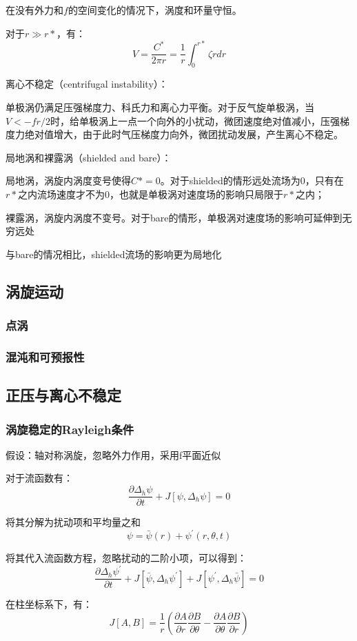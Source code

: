 \documentclass{article}
\begin{document}
在没有外力和$f$的空间变化的情况下，涡度和环量守恒。

对于$r \gg r*$，有：
$$V = \frac{C^*}{2\pi r}=\frac{1}{r}\int_0^{r*}\zeta rdr$$

离心不稳定（centrifugal instability）：

单极涡仍满足压强梯度力、科氏力和离心力平衡。对于反气旋单极涡，当$V<-fr/2$时，给单极涡上一点一个向外的小扰动，微团速度绝对值减小，压强梯度力绝对值增大，由于此时气压梯度力向外，微团扰动发展，产生离心不稳定。

局地涡和裸露涡（shielded and bare）：

局地涡，涡旋内涡度变号使得$C*=0$。对于shielded的情形远处流场为$0$，只有在$r*$之内流场速度才不为$0$，也就是单极涡对速度场的影响只局限于$r*$之内；

裸露涡，涡旋内涡度不变号。对于bare的情形，单极涡对速度场的影响可延伸到无穷远处

与bare的情况相比，shielded流场的影响更为局地化


\subsection{涡旋运动}
\subsubsection{点涡}
\subsubsection{混沌和可预报性}

\subsection{正压与离心不稳定}
\subsubsection{涡旋稳定的Rayleigh条件}
假设：轴对称涡旋，忽略外力作用，采用f平面近似

对于流函数有：
$$\frac{\partial\Delta_h\psi}{\partial t} + J[\psi, \Delta_h\psi] = 0$$

将其分解为扰动项和平均量之和
$$\psi = \bar{\psi}(r) + \psi^{\prime}(r,\theta,t)$$

将其代入流函数方程，忽略扰动的二阶小项，可以得到：
$$\frac{\partial\Delta_h\psi^{\prime}}{\partial t} + J[\bar{\psi}, \Delta_h\psi^{\prime}] +J[\psi^{\prime}, \Delta_h\bar{\psi}] = 0$$

在柱坐标系下，有：
$$J[A,B] = \frac{1}{r}(\frac{\partial A}{\partial r}\frac{\partial B}{\partial \theta}-\frac{\partial A}{\partial \theta}\frac{\partial B}{\partial r})$$
\end{document}
